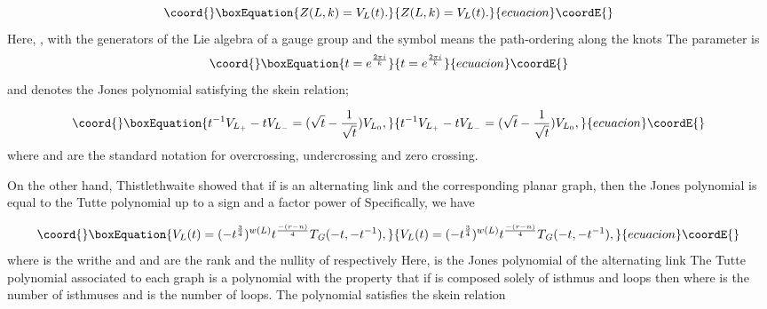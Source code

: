 \documentclass[a4paper,12pt]{article}
\begin{document}
\begin{equation}\coord{}\boxEquation{
Z(L,k)=V_{L}(t).  \label{34}
}{
Z(L,k)=V_{L}(t).  }{ecuacion}\coordE{}\end{equation}
Here, \coordHE{}, with \coordHE{} the generators of the Lie
algebra of a gauge group \coordHE{} and the symbol \coordHE{} means the path-ordering
along the knots \coordHE{} The parameter \coordHE{} is 
\begin{equation}\coord{}\boxEquation{
t=e^{\frac{2\pi i}{k}}  \label{35}
}{
t=e^{\frac{2\pi i}{k}}  }{ecuacion}\coordE{}\end{equation}
and \coordHE{} denotes the Jones polynomial satisfying the skein relation;

\begin{equation}\coord{}\boxEquation{
t^{-1}V_{L_{+}}-tV_{L_{-}}=(\sqrt{t}-\frac{1}{\sqrt{t}})V_{L_{0}},
\label{36}
}{
t^{-1}V_{L_{+}}-tV_{L_{-}}=(\sqrt{t}-\frac{1}{\sqrt{t}})V_{L_{0}},
}{ecuacion}\coordE{}\end{equation}
where \coordHE{} and \coordHE{} are the standard notation for overcrossing,
undercrossing and zero crossing.

On the other hand, Thistlethwaite\coordHE{} showed that if \coordHE{} is an
alternating link and \coordHE{} the corresponding planar graph, then
the Jones polynomial \coordHE{} is equal to the Tutte polynomial \coordHE{} up to a sign and a factor power of \coordHE{} Specifically, we
have

\begin{equation}\coord{}\boxEquation{
V_{L}(t)=(-t^{\frac{3}{4}})^{w(L)}t^{\frac{-(r-n)}{4}}T_{\mathit{G}
}(-t,-t^{-1}),  \label{37}
}{
V_{L}(t)=(-t^{\frac{3}{4}})^{w(L)}t^{\frac{-(r-n)}{4}}T_{\mathit{G}
}(-t,-t^{-1}),  }{ecuacion}\coordE{}\end{equation}
where \coordHE{} is the writhe and \coordHE{} and \coordHE{} are the rank and the nullity of \coordHE{} respectively\coordHE{} Here, \coordHE{} is the Jones polynomial of the
alternating link \coordHE{} The Tutte polynomial associated to each graph \coordHE{} is a polynomial \coordHE{} with the property that if \coordHE{} is composed solely of isthmus and loops then \coordHE{} where \coordHE{} is the number of isthmuses and \coordHE{} is
the number of loops. The polynomial \coordHE{} satisfies the skein
relation
\end{document}
